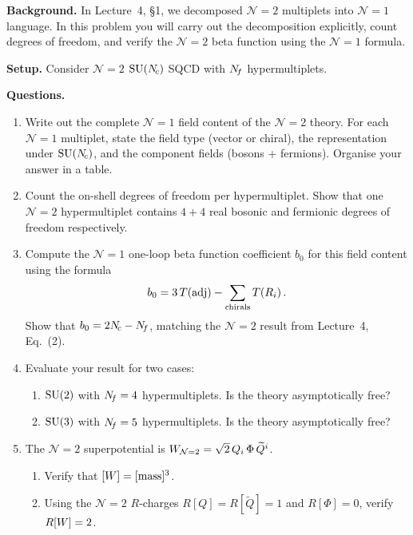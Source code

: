 \documentclass[11pt,a4paper]{article}
\begin{document}
\noindent\textbf{Background.}
In Lecture~4, \S1, we decomposed $\mathcal{N}=2$ multiplets into
$\mathcal{N}=1$ language.  In this problem you will carry out the
decomposition explicitly, count degrees of freedom, and verify the
$\mathcal{N}=2$ beta function using the $\mathcal{N}=1$ formula.

\medskip

\noindent\textbf{Setup.}
Consider $\mathcal{N}=2$ $\mathrm{SU}(N_{\!c})$ SQCD with $N_{\!f}$ hypermultiplets.

\medskip

\noindent\textbf{Questions.}
\begin{enumerate}[label=(\alph*)]
  \item Write out the complete $\mathcal{N}=1$ field content of the
    $\mathcal{N}=2$ theory.  For each $\mathcal{N}=1$ multiplet, state
    the field type (vector or chiral), the representation under
    $\mathrm{SU}(N_{\!c})$, and the component fields (bosons + fermions).  Organise
    your answer in a table.

  \item Count the on-shell degrees of freedom per hypermultiplet.  Show
    that one $\mathcal{N}=2$ hypermultiplet contains $4 + 4$ real
    bosonic and fermionic degrees of freedom respectively.

  \item Compute the $\mathcal{N}=1$ one-loop beta function coefficient
    $b_0$ for this field content using the formula
    \[
      b_0 = 3\,T(\mathrm{adj}) - \sum_{\text{chirals}} T(R_i)\,.
    \]
    Show that $b_0 = 2N_{\!c} - N_{\!f}$, matching the $\mathcal{N}=2$ result
    from Lecture~4, Eq.~(2).

  \item Evaluate your result for two cases:
    \begin{enumerate}[label=(\roman*)]
      \item $\mathrm{SU}(2)$ with $N_{\!f} = 4$ hypermultiplets.  Is the theory
        asymptotically free?
      \item $\mathrm{SU}(3)$ with $N_{\!f} = 5$ hypermultiplets.  Is the theory
        asymptotically free?
    \end{enumerate}

  \item The $\mathcal{N}=2$ superpotential is
    $W_{\mathcal{N}=2} = \sqrt{2}\, Q_i\, \Phi\, \widetilde{Q}^i$.
    \begin{enumerate}[label=(\roman*)]
      \item Verify that $[W] = [\mathrm{mass}]^3$.
      \item Using the $\mathcal{N}=2$ $R$-charges $R[Q] = R[\widetilde{Q}]
        = 1$ and $R[\Phi] = 0$, verify $R[W] = 2$.
    \end{enumerate}
\end{enumerate}
\end{document}
